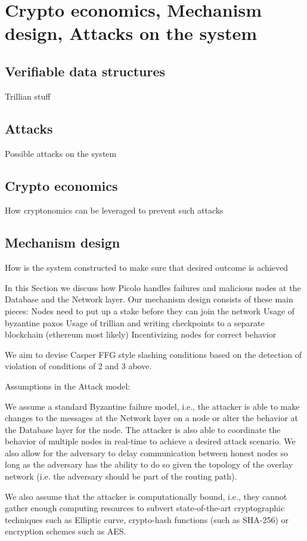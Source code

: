 \section{Crypto economics, Mechanism design, Attacks on the system}
\subsection{Verifiable data structures}
Trillian stuff
\subsection{Attacks}
Possible attacks on the system
\subsection{Crypto economics}
How cryptonomics can be leveraged to prevent such attacks
\subsection{Mechanism design}
How is the system constructed to make sure that desired outcome is achieved

In this Section we discuss how Picolo handles failures and malicious nodes at the Database and the Network layer. Our mechanism design consists of these main pieces:
Nodes need to put up a stake before they can join the network
Usage of byzantine paxos
Usage of trillian and writing checkpoints to a separate blockchain (ethereum most likely)
Incentivizing nodes for correct behavior

We aim to devise Casper FFG style slashing conditions based on the detection of violation of conditions of 2 and 3 above.

Assumptions in the Attack model:

We assume a standard Byzantine failure model, i.e., the attacker is able to make changes to the messages at the Network layer on a node or alter the behavior at the Database layer for the node. The attacker is also able to coordinate the behavior of multiple nodes in real-time to achieve a desired attack scenario. We also allow for the adversary to delay communication between honest nodes so long as the adversary has the ability to do so given the topology of the overlay network (i.e. the adversary should be part of the routing path).

We also assume that the attacker is computationally bound, i.e., they cannot gather enough computing resources to subvert state-of-the-art cryptographic techniques such as Elliptic curve, crypto-hash functions (such as SHA-256) or encryption schemes such as AES.

